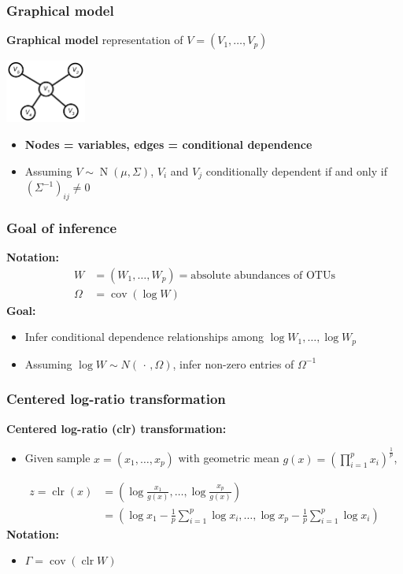 \documentclass{beamer}
\newcommand{\clr}{\operatorname{clr}}
\newcommand{\N}{\operatorname{N}}
\newcommand{\cov}{\operatorname{cov}}
\begin{document}
\begin{frame}
\frametitle{Graphical model}
\textbf{Graphical model} representation of $V = (V_1, \dots, V_p)$
\begin{center}
\includegraphics[width=100px]{figs/graph-model.pdf}
\end{center}
\begin{itemize}
\item \textbf{Nodes = variables, edges = conditional dependence}
\pause
\item Assuming $V \sim \N(\mu, \Sigma)$, $V_i$ and $V_j$ conditionally dependent if and only if $(\Sigma^{-1})_{ij} \ne 0$
\end{itemize}
\end{frame}

\begin{frame}
\frametitle{Goal of inference}
\textbf{Notation:}
\begin{align*}
W &= (W_1, \dots, W_p) = \text{absolute abundances of OTUs} \\
\Omega &= \cov(\log W)
\end{align*}
\pause
\textbf{Goal:}
\begin{itemize}
\item Infer conditional dependence relationships among $\log W_1, \dots, \log W_p$
\item Assuming $\log W \sim N(\,\cdot\,, \Omega)$, infer non-zero entries of $\Omega^{-1}$
\end{itemize}
\end{frame}

\begin{frame}
\frametitle{Centered log-ratio transformation}
\textbf{Centered log-ratio (clr) transformation:}
\begin{itemize}
\item Given sample $x = (x_1, \dots, x_p)$ with geometric mean $g(x) = (\prod_{i=1}^p x_i)^{\frac{1}{p}}$,
\end{itemize}
\pause
\begin{align*}
z = \clr(x) &= \left( \log \frac{x_1}{g(x)}, \dots, \log \frac{x_p}{g(x)} \right) \\
&= \left( \log x_1 - \frac{1}{p}\sum_{i=1}^p \log x_i, \dots, \log x_p - \frac{1}{p}\sum_{i=1}^p \log x_i \right)
\end{align*}
\pause
\textbf{Notation:}
\begin{itemize}
\item $\Gamma = \cov(\clr W)$
\end{itemize}
\end{frame}
\end{document}
